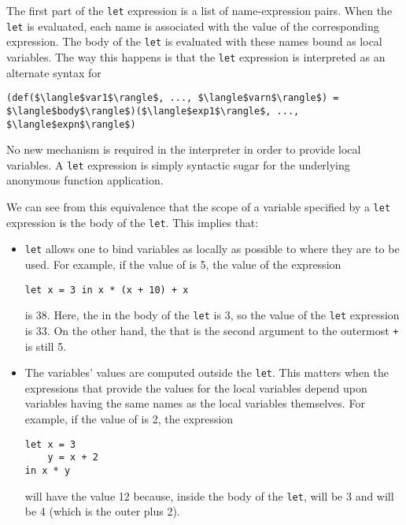 The first part of the \texttt{let} expression is a list of name-expression pairs. When the \texttt{let} is evaluated, each name is associated with the value of the corresponding expression. The body of the \texttt{let} is evaluated with these names bound as local variables. The way this happens is that the \texttt{let} expression is interpreted as an alternate syntax for

\begin{lstlisting}[style=plain]
(def($\langle$var1$\rangle$, ..., $\langle$varn$\rangle$) = $\langle$body$\rangle$)($\langle$exp1$\rangle$, ..., $\langle$expn$\rangle$)
\end{lstlisting}

No new mechanism is required in the interpreter in order to provide local variables. A \texttt{let} expression is simply syntactic sugar for the underlying anonymous function application.

We can see from this equivalence that the scope of a variable specified by a \texttt{let} expression is the body of the \texttt{let}. This implies that:

\begin{itemize}
\item \texttt{let} allows one to bind variables as locally as possible to where they are to be used. For example, if the value of  is 5, the value of the expression

\begin{lstlisting}[style=slate]
let x = 3 in x * (x + 10) + x
\end{lstlisting}

is 38. Here, the  in the body of the \texttt{let} is 3, so the value of the \texttt{let} expression is 33. On the other hand, the  that is the second argument to the outermost \texttt{+} is still 5.

\item The variables' values are computed outside the \texttt{let}. This matters when the expressions that provide the values for the local variables depend upon variables having the same names as the local variables themselves. For example, if the value of  is 2, the expression

\begin{lstlisting}[style=slate]
let x = 3
    y = x + 2
in x * y
\end{lstlisting}

will have the value 12 because, inside the body of the \texttt{let},  will be 3 and  will be 4 (which is the outer  plus 2).
\end{itemize}

